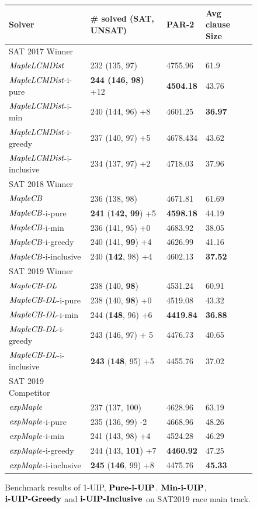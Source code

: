 \documentclass[runningheads]{llncs}
\begin{document}
\begin{figure} 
\begin{center}
\begin{tabular}{ | m{3.7cm} | m{4cm}| m{2cm} | m{2.75cm} |  } 
\hline
Solver & \# solved (SAT, UNSAT) & PAR-2 & Avg clause Size \\ 
\hline
SAT 2017 Winner & & & \\
$\textit{MapleLCMDist}$ & 232 (135, 97) & 4755.96 & 61.9  \\ 
\hline
$\textit{MapleLCMDist}$-i-pure & \textbf{244 (146, 98)} +12 & \textbf{4504.18} & 43.76 \\
\hline
$\textit{MapleLCMDist}$-i-min & 240 (144, 96) +8 & 4601.25 & \textbf{36.97} \\ 
\hline
$\textit{MapleLCMDist}$-i-greedy & 237 (140, 97) +5 & 4678.434 & 43.62 \\ 
\hline
$\textit{MapleLCMDist}$-i-inclusive & 234 (137, 97) +2 & 4718.03 & 37.96 \\
\hline
\hline
SAT 2018 Winner & & & \\
$\textit{MapleCB}$ & 236 (138, 98) & 4671.81 & 61.69 \\
\hline
$\textit{MapleCB}$-i-pure & \textbf{241} (\textbf{142, 99}) +5 & \textbf{4598.18} & 44.19 \\
\hline
$\textit{MapleCB}$-i-min & 236 (141, 95) +0 & 4683.92 & 38.05 \\ 
\hline
$\textit{MapleCB}$-i-greedy & 240 (141, \textbf{99}) +4 & 4626.99 & 41.16 \\
\hline
$\textit{MapleCB}$-i-inclusive & 240 (\textbf{142}, 98) +4 & 4602.13 & \textbf{37.52} \\
\hline
\hline
SAT 2019 Winner & & & \\
$\textit{MapleCB-DL}$ & 238 (140, \textbf{98}) & 4531.24 & 60.91 \\
\hline
$\textit{MapleCB-DL}$-i-pure & 238 (140, \textbf{98}) +0 & 4519.08 &  43.32\\
\hline
$\textit{MapleCB-DL}$-i-min & 244 (\textbf{148}, 96) +6 & \textbf{4419.84} & \textbf{36.88} \\
\hline
$\textit{MapleCB-DL}$-i-greedy & 243 (146, 97) + 5 & 4476.73 & 40.65 \\
\hline
$\textit{MapleCB-DL}$-i-inclusive & \textbf{243} (\textbf{148}, 95) +5 & 4455.76 & 37.02 \\
\hline
\hline
SAT 2019 Competitor & & &\\
$\textit{expMaple}$ & 237 (137, 100)  & 4628.96 & 63.19 \\
\hline
$\textit{expMaple}$-i-pure & 235 (136, 99) -2  & 4668.96 & 48.26 \\
\hline
$\textit{expMaple}$-i-min & 241 (143, 98) +4 & 4524.28 & 46.29 \\ 
\hline
$\textit{expMaple}$-i-greedy & 244 (143, \textbf{101}) +7 & \textbf{4460.92} & 47.25 \\
\hline
$\textit{expMaple}$-i-inclusive & \textbf{245} (\textbf{146}, 99) +8 & 4475.76 & \textbf{45.33} \\
\hline
\end{tabular}
\end{center}
\caption{Benchmark results of 1-UIP, $\textbf{Pure-i-UIP}$. $\textbf{Min-i-UIP}$, $\textbf{i-UIP-Greedy}$ and $\textbf{i-UIP-Inclusive}$ on SAT2019 race main track.}
\label{fig:t5}
\end{figure}
\end{document}
